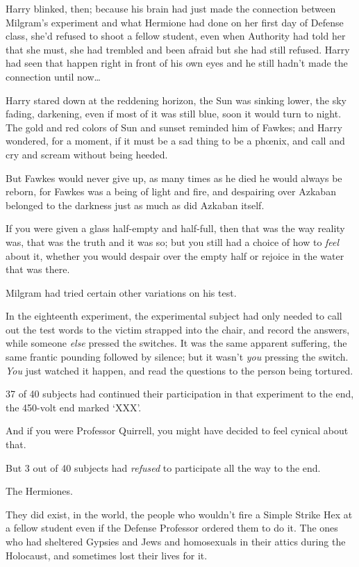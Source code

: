 Harry blinked, then; because his brain had just made the connection between Milgram's experiment and what Hermione had done on her first day of Defense class, she'd refused to shoot a fellow student, even when Authority had told her that she must, she had trembled and been afraid but she had still refused. Harry had seen that happen right in front of his own eyes and he still hadn't made the connection until now{\ldots}

Harry stared down at the reddening horizon, the Sun was sinking lower, the sky fading, darkening, even if most of it was still blue, soon it would turn to night. The gold and red colors of Sun and sunset reminded him of Fawkes; and Harry wondered, for a moment, if it must be a sad thing to be a phœnix, and call and cry and scream without being heeded.

But Fawkes would never give up, as many times as he died he would always be reborn, for Fawkes was a being of light and fire, and despairing over Azkaban belonged to the darkness just as much as did Azkaban itself.

If you were given a glass half-empty and half-full, then that was the way reality was, that was the truth and it was so; but you still had a choice of how to \emph{feel} about it, whether you would despair over the empty half or rejoice in the water that was there.

Milgram had tried certain other variations on his test.

In the eighteenth experiment, the experimental subject had only needed to call out the test words to the victim strapped into the chair, and record the answers, while someone \emph{else} pressed the switches. It was the same apparent suffering, the same frantic pounding followed by silence; but it wasn't \emph{you} pressing the switch. \emph{You} just watched it happen, and read the questions to the person being tortured.

37 of 40 subjects had continued their participation in that experiment to the end, the 450-volt end marked `XXX'.

And if you were Professor Quirrell, you might have decided to feel cynical about that.

But 3 out of 40 subjects had \emph{refused} to participate all the way to the end.

The Hermiones.

They did exist, in the world, the people who wouldn't fire a Simple Strike Hex at a fellow student even if the Defense Professor ordered them to do it. The ones who had sheltered Gypsies and Jews and homosexuals in their attics during the Holocaust, and sometimes lost their lives for it.


